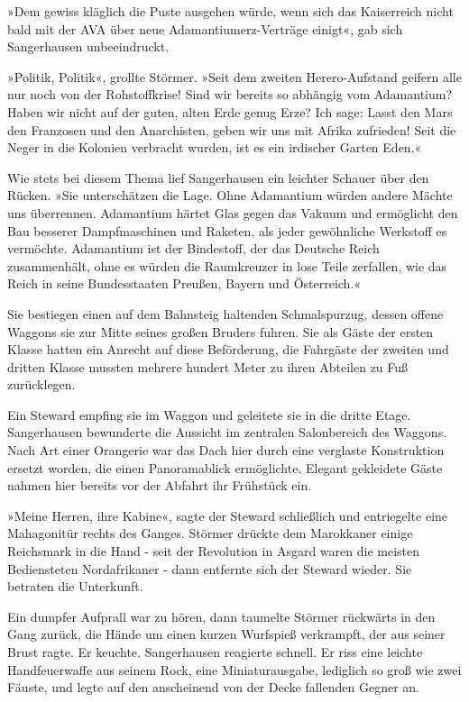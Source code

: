 »Dem gewiss kläglich die Puste ausgehen würde, wenn sich das
Kaiserreich nicht bald mit der AVA über neue Adamantiumerz-Verträge
einigt«, gab sich Sangerhausen unbeeindruckt.

»Politik, Politik«, grollte Störmer. »Seit dem zweiten
Herero-Aufstand geifern alle nur noch von der Rohstoffkrise! Sind
wir bereits so abhängig vom Adamantium? Haben wir nicht auf der
guten, alten Erde genug Erze? Ich sage: Lasst den Mars den
Franzosen und den Anarchisten, geben wir uns mit Afrika zufrieden!
Seit die Neger in die Kolonien verbracht wurden, ist es ein
irdischer Garten Eden.«

Wie stets bei diesem Thema lief Sangerhausen ein leichter Schauer
über den Rücken. »Sie unterschätzen die Lage. Ohne Adamantium
würden andere Mächte uns überrennen. Adamantium härtet Glas gegen
das Vakuum und ermöglicht den Bau besserer Dampfmaschinen und
Raketen, als jeder gewöhnliche Werkstoff es vermöchte. Adamantium
ist der Bindestoff, der das Deutsche Reich zusammenhält, ohne es
würden die Raumkreuzer in lose Teile zerfallen, wie das Reich in
seine Bundesstaaten Preußen, Bayern und Österreich.«

Sie bestiegen einen auf dem Bahnsteig haltenden Schmalspurzug,
dessen offene Waggons sie zur Mitte seines großen Bruders fuhren.
Sie als Gäste der ersten Klasse hatten ein Anrecht auf diese
Beförderung, die Fahrgäste der zweiten und dritten Klasse mussten
mehrere hundert Meter zu ihren Abteilen zu Fuß zurücklegen.

Ein Steward empfing sie im Waggon und geleitete sie in die dritte
Etage. Sangerhausen bewunderte die Aussicht im zentralen
Salonbereich des Waggons. Nach Art einer Orangerie war das Dach
hier durch eine verglaste Konstruktion ersetzt worden, die einen
Panoramablick ermöglichte. Elegant gekleidete Gäste nahmen hier
bereits vor der Abfahrt ihr Frühstück ein.

»Meine Herren, ihre Kabine«, sagte der Steward schließlich und
entriegelte eine Mahagonitür rechts des Ganges. Störmer drückte dem
Marokkaner einige Reichsmark in die Hand - seit der Revolution in
Asgard waren die meisten Bediensteten Nordafrikaner - dann
entfernte sich der Steward wieder. Sie betraten die Unterkunft.

Ein dumpfer Aufprall war zu hören, dann taumelte Störmer rückwärts
in den Gang zurück, die Hände um einen kurzen Wurfspieß verkrampft,
der aus seiner Brust ragte. Er keuchte. Sangerhausen reagierte
schnell. Er riss eine leichte Handfeuerwaffe aus seinem Rock, eine
Miniaturausgabe, lediglich so groß wie zwei Fäuste, und legte auf
den anscheinend von der Decke fallenden Gegner an.

